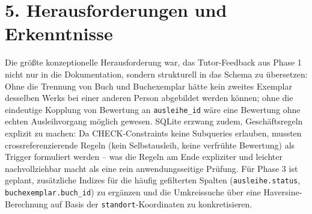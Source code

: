 \documentclass[11pt,a4paper]{article}
\begin{document}
\section*{5. Herausforderungen und Erkenntnisse}
Die größte konzeptionelle Herausforderung war, das Tutor-Feedback aus Phase 1 nicht nur in die Dokumentation, sondern strukturell in das Schema zu übersetzen: Ohne die Trennung von Buch und Buchexemplar hätte kein zweites Exemplar desselben Werks bei einer anderen Person abgebildet werden können; ohne die eindeutige Kopplung von Bewertung an \texttt{ausleihe\_id} wäre eine Bewertung ohne echten Ausleihvorgang möglich gewesen. SQLite erzwang zudem, Geschäftsregeln explizit zu machen: Da CHECK-Constraints keine Subqueries erlauben, mussten crossreferenzierende Regeln (kein Selbstausleih, keine verfrühte Bewertung) als Trigger formuliert werden -- was die Regeln am Ende expliziter und leichter nachvollziehbar macht als eine rein anwendungsseitige Prüfung. Für Phase 3 ist geplant, zusätzliche Indizes für die häufig gefilterten Spalten (\texttt{ausleihe.status}, \texttt{buchexemplar.buch\_id}) zu ergänzen und die Umkreissuche über eine Haversine-Berechnung auf Basis der \texttt{standort}-Koordinaten zu konkretisieren.
\end{document}
